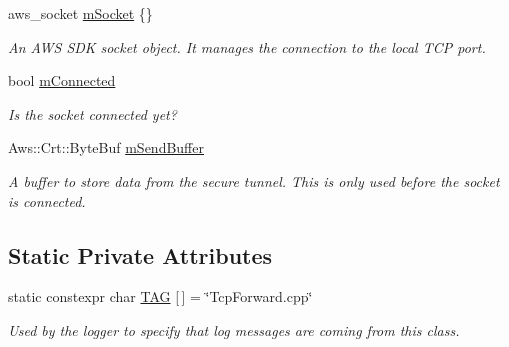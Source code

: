 \begin{DoxyCompactItemize}
aws\+\_\+socket \hyperlink{class_aws_1_1_iot_1_1_device_client_1_1_secure_tunneling_1_1_tcp_forward_a624e8376d97bd12aa650e3cd018efd7a}{m\+Socket} \{\}
\begin{DoxyCompactList}\small\item\em An A\+WS S\+DK socket object. It manages the connection to the local T\+CP port. \end{DoxyCompactList}\item 
\mbox{\label{class_aws_1_1_iot_1_1_device_client_1_1_secure_tunneling_1_1_tcp_forward_a899ca18e84f5f14bac91ae77b26dc41f}} 
bool \hyperlink{class_aws_1_1_iot_1_1_device_client_1_1_secure_tunneling_1_1_tcp_forward_a899ca18e84f5f14bac91ae77b26dc41f}{m\+Connected}
\begin{DoxyCompactList}\small\item\em Is the socket connected yet? \end{DoxyCompactList}\item 
\mbox{\label{class_aws_1_1_iot_1_1_device_client_1_1_secure_tunneling_1_1_tcp_forward_a6efb4ad2b675389b667621c154cb5b54}} 
Aws\+::\+Crt\+::\+Byte\+Buf \hyperlink{class_aws_1_1_iot_1_1_device_client_1_1_secure_tunneling_1_1_tcp_forward_a6efb4ad2b675389b667621c154cb5b54}{m\+Send\+Buffer}
\begin{DoxyCompactList}\small\item\em A buffer to store data from the secure tunnel. This is only used before the socket is connected. \end{DoxyCompactList}\end{DoxyCompactItemize}
\subsection*{Static Private Attributes}
\begin{DoxyCompactItemize}
\item 
\mbox{\label{class_aws_1_1_iot_1_1_device_client_1_1_secure_tunneling_1_1_tcp_forward_a2a696885fdeba14f64b09781b2275ab5}} 
static constexpr char \hyperlink{class_aws_1_1_iot_1_1_device_client_1_1_secure_tunneling_1_1_tcp_forward_a2a696885fdeba14f64b09781b2275ab5}{T\+AG} \mbox{[}$\,$\mbox{]} = \char`\"{}Tcp\+Forward.\+cpp\char`\"{}
\begin{DoxyCompactList}\small\item\em Used by the logger to specify that log messages are coming from this class. \end{DoxyCompactList}\end{DoxyCompactItemize}


